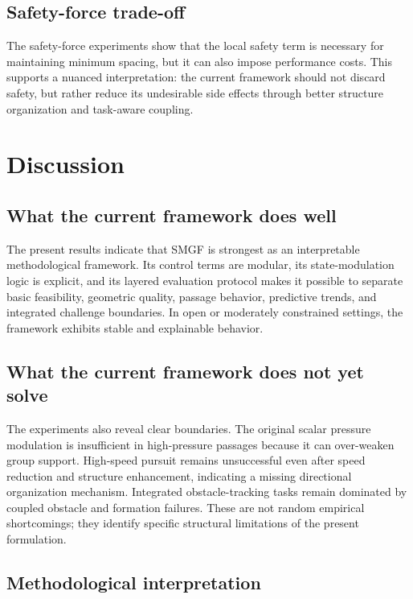 \documentclass[utf8]{FrontiersinHarvard}
\begin{document}
\subsection{Safety-force trade-off}

The safety-force experiments show that the local safety term is necessary for maintaining minimum spacing, but it can also impose performance costs. This supports a nuanced interpretation: the current framework should not discard safety, but rather reduce its undesirable side effects through better structure organization and task-aware coupling.

\section{Discussion}

\subsection{What the current framework does well}

The present results indicate that SMGF is strongest as an interpretable methodological framework. Its control terms are modular, its state-modulation logic is explicit, and its layered evaluation protocol makes it possible to separate basic feasibility, geometric quality, passage behavior, predictive trends, and integrated challenge boundaries. In open or moderately constrained settings, the framework exhibits stable and explainable behavior.

\subsection{What the current framework does not yet solve}

The experiments also reveal clear boundaries. The original scalar pressure modulation is insufficient in high-pressure passages because it can over-weaken group support. High-speed pursuit remains unsuccessful even after speed reduction and structure enhancement, indicating a missing directional organization mechanism. Integrated obstacle-tracking tasks remain dominated by coupled obstacle and formation failures. These are not random empirical shortcomings; they identify specific structural limitations of the present formulation.

\subsection{Methodological interpretation}
\end{document}
